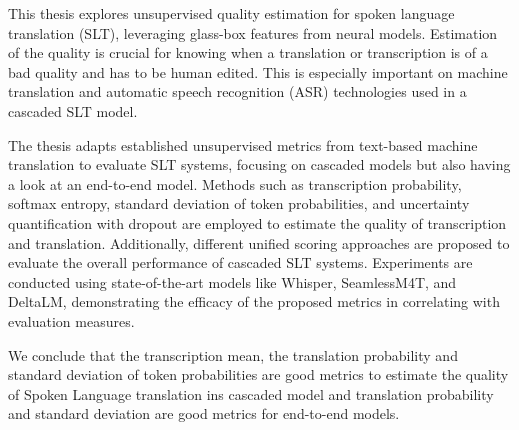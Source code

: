 
\Abstract
This thesis explores unsupervised quality estimation for spoken language translation (SLT), leveraging glass-box features from neural models. Estimation of the quality is crucial for knowing when a translation or transcription is of a bad quality and has to be human edited. This is especially important on machine translation and automatic speech recognition (ASR) technologies used in a cascaded SLT model. 

The thesis adapts established unsupervised metrics from text-based machine translation to evaluate SLT systems, focusing on cascaded models but also having a look at an end-to-end model.
Methods such as transcription probability, softmax entropy, standard deviation of token probabilities, and uncertainty quantification with dropout are employed to estimate the quality of transcription and translation. Additionally, different unified scoring approaches are proposed to evaluate the overall performance of cascaded SLT systems. Experiments are conducted using state-of-the-art models like Whisper, SeamlessM4T, and DeltaLM, demonstrating the efficacy of the proposed metrics in correlating with evaluation measures. 

We conclude that the transcription mean, the translation probability and standard deviation of token probabilities are good metrics to estimate the quality of Spoken Language translation ins cascaded model and translation probability and standard deviation are good metrics for end-to-end models. 
